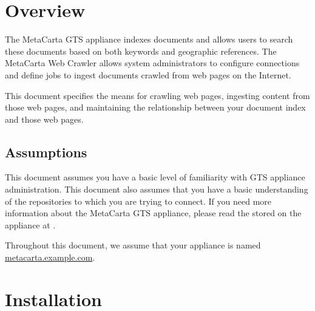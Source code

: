 %
%

\begin{changemargin}{1.5in}{0in}

\section{Overview}

The MetaCarta GTS appliance indexes documents and allows users to
search these documents based on both keywords and geographic
references. The MetaCarta Web Crawler allows system administrators
to configure connections and define jobs to ingest documents crawled
from web pages on the Internet.

This document specifies the means for crawling web pages, ingesting
content from those web pages, and maintaining the relationship between
your document index and those web pages.

\subsection{Assumptions}

This document assumes you have a basic level of familiarity with GTS
appliance administration. This document also assumes that you have a
basic understanding of the repositories to which you are trying to
connect. If you need more information about the MetaCarta GTS
appliance, please read the  stored on the appliance at
.

Throughout this document, we assume that your appliance is named \\
\url{metacarta.example.com}. 

\section{Installation}


\end{changemargin}
